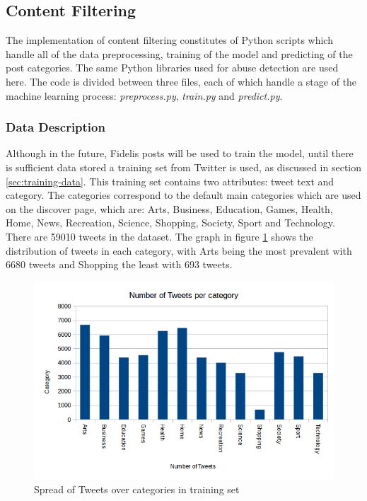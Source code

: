 \subsection{Content Filtering}
The implementation of content filtering constitutes of Python scripts which handle all of the data preprocessing, training of the model and predicting of the post categories. The same Python libraries used for abuse detection are used here. The code is divided between three files, each of which handle a stage of the machine learning process: \emph{preprocess.py}, \emph{train.py} and \emph{predict.py}.

\subsubsection{Data Description}
Although in the future, Fidelis posts will be used to train the model, until there is sufficient data stored a training set from Twitter is used, as discussed in section \ref{sec:training-data}. This training set contains two attributes: tweet text and category. The categories correspond to the default main categories which are used on the discover page, which are: Arts, Business, Education, Games, Health, Home, News, Recreation, Science, Shopping, Society, Sport and Technology. There are 59010 tweets in the dataset. The graph in figure \ref{fig:category-spread} shows the distribution of tweets in each category, with Arts being the most prevalent with 6680 tweets and Shopping the least with 693 tweets.

\begin{figure}[H]
\centering
\includegraphics[width=\textwidth]{Images/Implementation/category-spread}
\caption{Spread of Tweets over categories in training set}
\label{fig:category-spread}
\end{figure}

